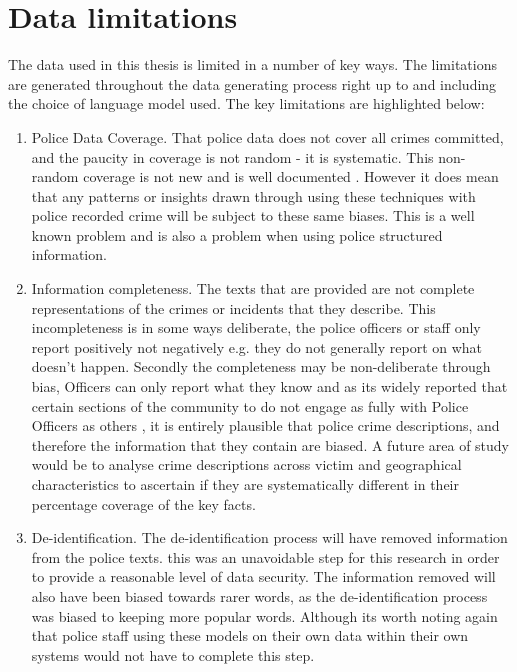 \section{Data limitations} The data used in this thesis is limited in a number of key ways. The limitations are generated throughout the data generating process right up to and including the choice of language model used. The key limitations are highlighted below:

\begin{enumerate}
    
    \item Police Data Coverage. That police data does not cover all crimes committed, and the paucity in coverage is not random - it is systematic. This non-random coverage is not new and is well documented \parencite{Tarling}. However it does mean that any patterns or insights drawn through using these techniques with police recorded crime will be subject to these same biases. This is a well known problem and is also a problem when using police structured information.
    
    \item Information completeness. The texts that are provided are not complete representations of the crimes or incidents that they describe. This incompleteness is in some ways deliberate, the police officers or staff only report positively not negatively e.g. they do not generally report on what doesn't happen. Secondly the completeness may be non-deliberate through bias, Officers can only report what they know and as its widely reported that certain sections of the community to do not engage as fully with Police Officers as others \parencite{buil2021accuracy}, it is entirely plausible that police crime descriptions, and therefore the information that they contain are biased. A future area of study would be to analyse crime descriptions across victim and geographical characteristics to ascertain if they are systematically different in their percentage coverage of the key facts.
    
    \item De-identification. The de-identification process will have removed information from the police texts. this was an unavoidable step for this research in order to provide a reasonable level of data security. The information removed will also have been biased towards rarer words, as the de-identification process was biased to keeping more popular words. Although its worth noting again that police staff using these models on their own data within their own systems would not have to complete this step.
    

\end{enumerate}
